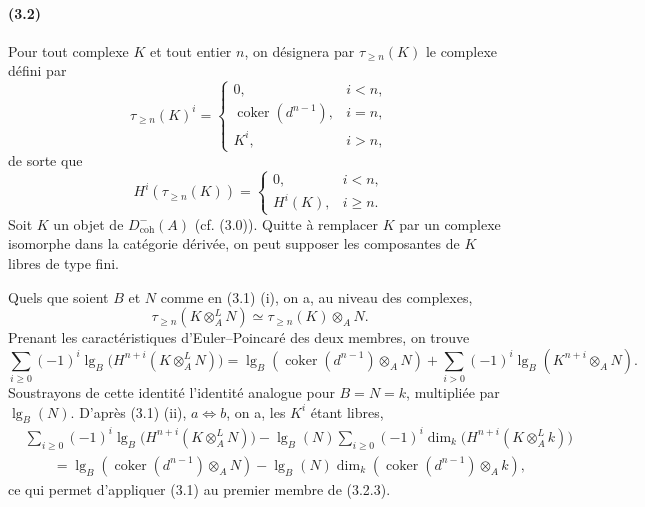 \documentclass[10pt]{article}
\providecommand{\lgop}{\operatorname{lg}}
\providecommand{\coker}{\operatorname{coker}}
\begin{document}
\paragraph{(3.2)} Pour tout complexe $K$ et tout entier $n$, on désignera par $\tau_{\ge n}(K)$ le complexe défini par
\[
\tag{3.2.1}
\tau_{\ge n}(K)^i=
\begin{cases}
0,& i<n,\\
\coker(d^{n-1}),& i=n,\\
K^i,& i>n,
\end{cases}
\]
de sorte que
\[
\tag{3.2.2}
H^i(\tau_{\ge n}(K))=
\begin{cases}
0,& i<n,\\
H^i(K),& i\ge n.
\end{cases}
\]
Soit $K$ un objet de $D^-_{\mathrm{coh}}(A)$ (cf. (3.0)). Quitte à remplacer $K$ par un complexe isomorphe dans la catégorie dérivée, on peut supposer les composantes de $K$ libres de type fini.

Quels que soient $B$ et $N$ comme en (3.1) (i), on a, au niveau des complexes,
\[
\tau_{\ge n}(K\otimes_A^L N)\simeq \tau_{\ge n}(K)\otimes_A N.
\]
Prenant les caractéristiques d'Euler--Poincaré des deux membres, on trouve
\[
\sum_{i\ge0}(-1)^i\lgop_B\bigl(H^{n+i}(K\otimes_A^L N)\bigr)
=\lgop_B(\coker(d^{n-1})\otimes_A N)+
\sum_{i>0}(-1)^i\lgop_B(K^{n+i}\otimes_A N).
\]
Soustrayons de cette identité l'identité analogue pour $B=N=k$, multipliée par $\lgop_B(N)$. D'après (3.1) (ii), $a\Leftrightarrow b$, on a, les $K^i$ étant libres,
\[
\tag{3.2.3}
\begin{aligned}
&\sum_{i\ge0}(-1)^i\lgop_B\bigl(H^{n+i}(K\otimes_A^L N)\bigr)
-\lgop_B(N)\sum_{i\ge0}(-1)^i\dim_k\bigl(H^{n+i}(K\otimes_A^L k)\bigr)\\
&\qquad=\lgop_B(\coker(d^{n-1})\otimes_A N)
-\lgop_B(N)\dim_k(\coker(d^{n-1})\otimes_A k),
\end{aligned}
\]
ce qui permet d'appliquer (3.1) au premier membre de (3.2.3).
\end{document}
